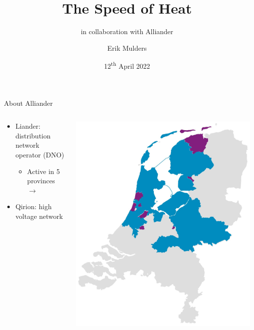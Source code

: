 \documentclass{beamer}
\title{The Speed of Heat}
\subtitle{in collaboration with Alliander}
\author{Erik Mulders}
\institute{Radboud University Nijmegen}
\date{12\textsuperscript{th} April 2022}
\begin{document}
	
	\frame{\titlepage}
	
	\begin{frame}{About Alliander}
		\begin{columns}[T]
			\begin{column}{0.5\linewidth}
				\begin{itemize}
					\item Liander: distribution network operator (DNO)
					\begin{itemize}
						\item Active in 5 provinces $\rightarrow$
					\end{itemize}
					\item Qirion: high voltage network
				\end{itemize}
			\end{column}
			\begin{column}{0.5\linewidth}
				\includegraphics[width=\linewidth]{liander-in-kaart}
			\end{column}
		\end{columns}
	\end{frame}
	
\end{document}
